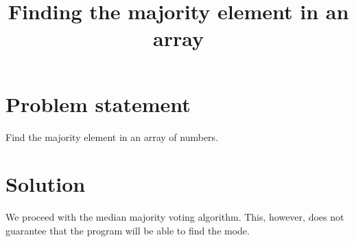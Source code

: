 \documentclass[12pt]{article}
\title{Finding the majority element in an array}
\begin{document}
\maketitle
\section{Problem statement}
Find the majority element in an array of numbers.
\section{Solution}
We proceed with the median majority voting algorithm. This, however, does not guarantee that
the program will be able to find the mode.
\end{document}
